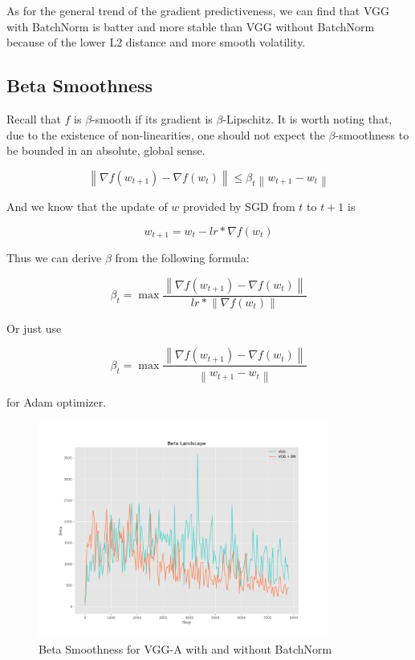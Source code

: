 \documentclass[a4paper, 11pt]{article} %
\begin{document}
As for the general trend of the gradient predictiveness, we can find that VGG with BatchNorm
is batter and more stable than VGG without BatchNorm because of the lower L2 distance and
more smooth volatility.

\subsection{\textbf{Beta Smoothness}}

Recall that $f$ is $\beta$-smooth if its gradient is $\beta$-Lipschitz. It is worth noting
that, due to the existence of non-linearities, one should not expect the $\beta$-smoothness
to be bounded in an absolute, global sense.

$$
	\left\|\nabla f\left(w_{t+1}\right)-\nabla f\left(w_{t}\right)\right\| \leq \beta_{t} \left\|w_{t+1}-w_{t}\right\|
$$

And we know that the update of $w$ provided by SGD from $t$ to $t+1$ is

$$
	w_{t+1}=w_{t}-lr*\nabla f\left(w_{t}\right)
$$

Thus we can derive $\beta$ from the following formula:

$$
	\beta_{t} = \max \frac{\left\|\nabla f\left(w_{t+1}\right)-\nabla f\left(w_{t}\right)\right\|}{lr*\left\|\nabla f\left(w_{t}\right)\right\|}
$$

Or just use

$$
	\beta_{t} = \max \frac{\left\|\nabla f\left(w_{t+1}\right)-\nabla f\left(w_{t}\right)\right\|}{\left\|w_{t+1}-w_{t}\right\|}
$$

for Adam optimizer.

\begin{figure}[H]
	\centering
	\includegraphics[width=0.85\textwidth]{./img/beta-smooth.png}
	\caption{Beta Smoothness for VGG-A with and without BatchNorm}
\end{figure}
\end{document}
